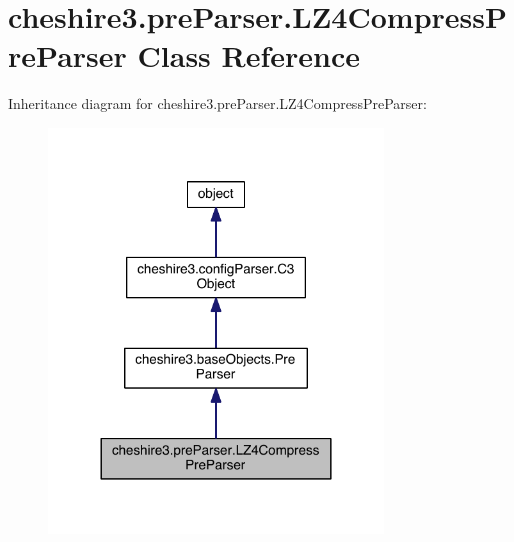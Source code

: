 \hypertarget{classcheshire3_1_1pre_parser_1_1_l_z4_compress_pre_parser}{\section{cheshire3.\-pre\-Parser.\-L\-Z4\-Compress\-Pre\-Parser Class Reference}
\label{classcheshire3_1_1pre_parser_1_1_l_z4_compress_pre_parser}
}


Inheritance diagram for cheshire3.\-pre\-Parser.\-L\-Z4\-Compress\-Pre\-Parser\-:
\nopagebreak
\begin{figure}[H]
\begin{center}
\leavevmode
\includegraphics[width=252pt]{classcheshire3_1_1pre_parser_1_1_l_z4_compress_pre_parser__inherit__graph}
\end{center}
\end{figure}



